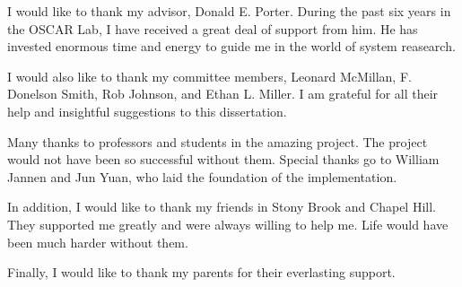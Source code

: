 \begin{acknowledgement}

I would like to thank my advisor, Donald E. Porter.
During the past six years in the OSCAR Lab, I have received a great deal of support from him.
He has invested enormous time and energy to guide me in the world of system
reasearch.

I would also like to thank my committee members,
Leonard McMillan,
F. Donelson Smith,
Rob Johnson,
and Ethan L. Miller.
I am grateful for all their help and insightful suggestions to this dissertation.

Many thanks to professors and students in the amazing \betrfs project.
The project would not have been so successful without them.
Special thanks go to William Jannen and Jun Yuan,
who laid the foundation of the \betrfs implementation.

In addition, I would like to thank my friends in Stony Brook and Chapel
Hill.
They supported me greatly and were always willing to help me.
Life would have been much harder without them.

Finally, I would like to thank my parents for their everlasting support.

\end{acknowledgement}
